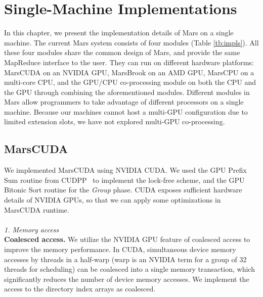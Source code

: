 \chapter{Single-Machine Implementations}\label{sec-implement}
In this chapter, we present the implementation details of Mars on a
single machine. The current Mars system consists of four modules
(Table \ref{tb:impls}). All these four modules share the common
design of Mars, and provide the same MapReduce interface to the
user. They can run on different hardware platforms: MarsCUDA on
an NVIDIA GPU, MarsBrook on an AMD GPU, MarsCPU on a multi-core CPU,
and the GPU/CPU co-processing module on both the CPU and the GPU
through combining the aforementioned modules.  Different modules in
Mars allow programmers to take advantage of different processors on
a single machine. Because our machines cannot host a multi-GPU configuration due to limited extension slots, we have not explored multi-GPU co-processing.

\begin{table}[htb]
  \centering
\end{table}

\section{MarsCUDA}

We implemented MarsCUDA using NVIDIA CUDA. We used the GPU
Prefix Sum routine from CUDPP~\cite{CUDPP} to implement the lock-free scheme, and
the GPU Bitonic Sort routine for the {\em Group} phase.
CUDA exposes sufficient hardware details of NVIDIA GPUs, so that we can
apply some optimizations in MarsCUDA runtime.
\\\\
{\em 1. Memory access}
\\
{\bf Coalesced access.} We utilize the NVIDIA GPU feature of
coalesced access to improve the memory performance. In CUDA,
simultaneous device memory accesses by threads in a half-warp (warp is an NVIDIA term for a group of 32 threads for scheduling) can be
coalesced into a single memory transaction, which significantly
reduces the number of device memory accesses.
We implement the access to the directory index arrays as coalesced.

